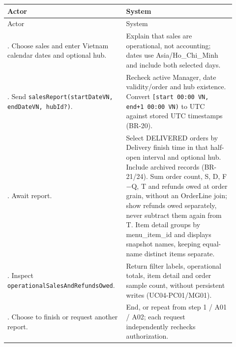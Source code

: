 \begin{longtable}{>{\raggedright\arraybackslash}p{0.4600\linewidth}>{\raggedright\arraybackslash}p{0.4600\linewidth}}
Actor & System \\
\hline\endfirsthead
Actor & System \\
\hline\endhead
1. Choose sales and enter Vietnam calendar dates and optional hub. & Explain that sales are operational, not accounting; dates use Asia/Ho\_Chi\_Minh and include both selected days. \\
2. Send \texttt{salesReport(startDateVN, endDateVN, hubId?)}. & Recheck active Manager, date validity/order and hub existence. Convert \texttt{[start 00:00 VN, end+1 00:00 VN)} to UTC against stored UTC timestamps (BR-20). \\
3. Await report. & Select DELIVERED orders by Delivery finish time in that half-open interval and optional hub. Include archived records (BR-21/24). Sum order count, S, D, F\ensuremath{-}Q, T and refunds owed at order grain, without an OrderLine join; show refunds owed separately, never subtract them again from T. Item detail groups by menu\_item\_id and displays snapshot names, keeping equal-name distinct items separate. \\
4. Inspect \texttt{operationalSalesAndRefundsOwed}. & Return filter labels, operational totals, item detail and order sample count, without persistent writes (UC04-PC01/MG01). \\
5. Choose to finish or request another report. & End, or repeat from step 1 / A01 / A02; each request independently rechecks authorization. \\
\end{longtable}
